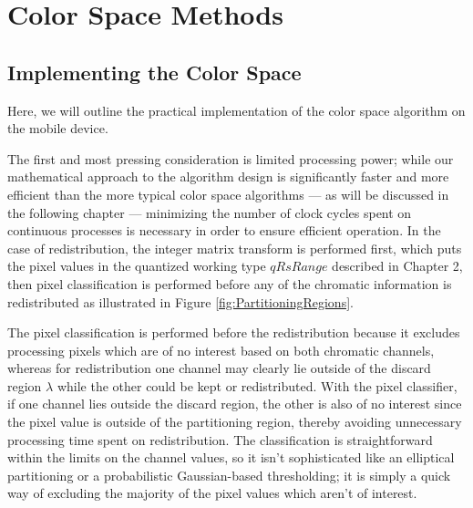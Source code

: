 
\chapter{Color Space Methods}

\section{Implementing the Color Space}\label{sec:ImplementingTheColorSpaceApp}

Here, we will outline the practical implementation of the color space algorithm on the mobile device.

The first and most pressing consideration is limited processing power; while our mathematical approach to the algorithm design is significantly faster and more efficient than the more typical color space algorithms --- as will be discussed in the following chapter --- minimizing the number of clock cycles spent on continuous processes is necessary in order to ensure efficient operation. In the case of redistribution, the integer matrix transform is performed first, which puts the pixel values in the quantized working type $qRsRange$ described in Chapter 2, then pixel classification is performed before any of the chromatic information is redistributed as illustrated in Figure \ref{fig:PartitioningRegions}.

The pixel classification is performed before the redistribution because it excludes processing pixels which are of no interest based on both chromatic channels, whereas for redistribution one channel may clearly lie outside of the discard region $\lambda$ while the other could be kept or redistributed. With the pixel classifier, if one channel lies outside the discard region, the other is also of no interest since the pixel value is outside of the partitioning region, thereby avoiding unnecessary processing time spent on redistribution. The classification is straightforward within the limits on the channel values, so it isn't sophisticated like an elliptical partitioning or a probabilistic Gaussian-based thresholding; it is simply a quick way of excluding the majority of the pixel values which aren't of interest.

